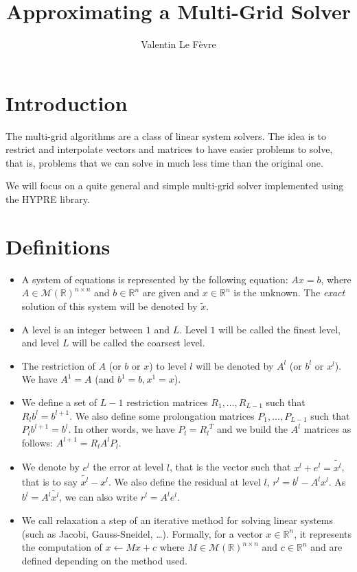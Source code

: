 \documentclass[a4paper,10pt]{article}
\title{Approximating a Multi-Grid Solver}
\author{Valentin Le Fèvre}
\begin{document}
\maketitle

\section{Introduction}

The multi-grid algorithms are a class of linear system solvers.
The idea is to restrict and interpolate vectors and matrices to have easier problems to solve, that is, problems that we can solve in much less time than the original one.

We will focus on a quite general and simple multi-grid solver implemented using the HYPRE library.

\section{Definitions}

\begin{itemize}
 \item A system of equations is represented by the following equation: $Ax=b$, where $A \in \mathcal{M}(\mathbb{R})^{n\times n}$ and $b \in \mathcal{\mathbb{R}}^n$ are given and
 $x \in \mathbb{R}^n$ is the unknown. The \emph{exact} solution of this system will be denoted by $\widetilde{x}$.
 \item A level is an integer between $1$ and $L$. Level $1$ will be called the finest level, and level $L$ will be called the coarsest level.
 \item The restriction of $A$ (or $b$ or $x$) to level $l$ will be denoted by $A^l$ (or $b^l$ or $x^l$). We have $A^1 = A$ (and $b^1=b,x^1=x$).
 \item We define a set of $L-1$ restriction matrices $R_1,\dots,R_{L-1}$ such that $R_l b^l = b^{l+1}$. We also define some prolongation matrices $P_1,\dots,P_{L-1}$ such that $P_{l}b^{l+1} = b^l$.
 In other words, we have $P_l = {R_l}^T$ and we build the $A^l$ matrices as follows: $A^{l+1} = R_l A^l P_l$.
 \item We denote by $e^l$ the error at level $l$, that is the vector such that $x^l + e^l = \widetilde{x^l}$, that is to say $\widetilde{x^l}-x^l$.
 We also define the residual at level $l$, $r^l = b^l - A^lx^l$. As $b^l = A^l\widetilde{x^l}$, we can also write $r^l = A^le^l$.
 \item We call relaxation a step of an iterative method for solving linear systems (such as Jacobi, Gauss-Sneidel, \dots). Formally, for a vector $x \in \mathbb{R}^n$, it represents the computation of
 $x \leftarrow Mx + c$ where $M \in \mathcal{M}(\mathbb{R})^{n\times n}$ and $c \in \mathcal{\mathbb{R}}^n$ and are defined depending on the method used.
\end{itemize}
\end{document}
